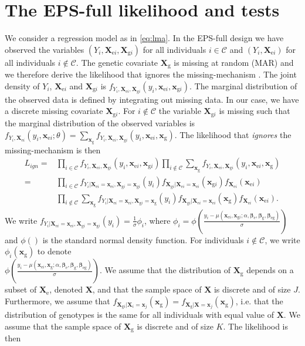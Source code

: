 \documentclass[10pt,a4paper]{article}
\def\bbetag{\bm{\beta}_{\text{g}}}
\def\bbetae{\bm{\beta}_{\text{e}}}
\def\bbetaeg{\bm{\beta}_{\text{eg}}}
\def\bx{\mathbf{x}}
\def\bX{\mathbf{X}}
\def\bxgi{\mathbf{x}_{\text{g}i}}
\def\bXgi{\mathbf{X}_{\text{g}i}}
\def\bxei{\mathbf{x}_{\text{e}i}}
\def\bXei{\mathbf{X}_{\text{e}i}}
\def\bxg{\mathbf{x}_{\text{g}}}
\def\bXg{\mathbf{X}_{\text{g}}}
\def\bXe{\mathbf{X}_{\text{e}}}
\begin{document}
\section{The EPS-full likelihood and tests}
We consider a regression model as in \eqref{eq:lma}. In the EPS-full design we have observed the variables $(Y_i,\bXei,\bXgi)$ for all individuals $i \in \mathcal{C}$ and $(Y_i,\bXei)$ for all individuals $i \not \in \mathcal{C}$. The genetic covariate $\bXg$ is missing at random (MAR) and we therefore derive the likelihood that ignores the missing-mechanism \citep{littlerubin2002}. The joint density of $Y_i$, $\bXei$ and $\bXgi$ is $f_{Y_i,\bXei, \bXgi}(y_i,\bxei,\bxgi)$. The marginal distribution of the observed data is defined by integrating out missing data. In our case, we have a discrete missing covariate $\bXgi$. For $i \not \in \mathcal{C}$ the variable $\bXgi$ is missing such that the marginal distribution of the observed variables is $f_{Y_i,\bXei}(y_i,\bxei;\theta) = \sum_{\bxg} f_{Y_i,\bXei,\bXgi}(y_i,\bxei,\bxg)$. The likelihood that \textit{ignores} the missing-mechanism is then
\begin{align*}
L_{ign} = & \prod_{i \in \mathcal{C}} f_{Y_i,\bXei,\bXgi}(y_i,\bxei,\bxgi) \prod_{i \not \in \mathcal{C}} \sum_{\bxg} f_{Y_i,\bXei,\bXgi}(y_i,\bxei,\bxg) \\
= & \prod_{i \in \mathcal{C}} f_{Y_i|\bXei = \bxei, \bXgi = \bxgi}(y_i) f_{\bXgi|\bXei = \bxei}(\bxgi)f_{\bXei}(\bxei)  \\ & \prod_{i \not \in \mathcal{C}}\sum_{\bxg} f_{Y_i|\bXei = \bxei, \bXgi = \bxg}(y_i) f_{\bXgi|\bXei = \bxei}(\bxg)f_{\bXei}(\bxei).
\end{align*}
We write $f_{Y_i|\bXei = \bxei, \bXgi = \bxgi}(y_i) = \frac{1}{\sigma}\phi_i$, where $\phi_i = \phi\left(\frac{y_i - \mu(\bxei, \bxgi; \alpha, \bbetae, \bbetag, \bbetaeg)}{\sigma}\right)$ and $\phi()$ is the standard normal density function. For individuals $i \not \in \mathcal{C}$, we write  $\phi_i(\bxg)$ to denote \\ $\phi\left(\frac{y_i - \mu(\bxei, \bxg; \alpha, \bbetae, \bbetag, \bbetaeg)}{\sigma}\right)$. We assume that the distribution of $\bXg$ depends on a subset of $\bXe$, denoted $\bX$, and that the sample space of $\bX$ is discrete and of size $J$. Furthermore, we assume that $f_{\bXgi|\bX_i = \bx_j}(\bxg) = f_{\bXg|\bX = \bx_j}(\bxg)$, i.e. that the distribution of genotypes is the same for all individuals with equal value of $\bX$. We assume that the sample space of $\bXg$ is discrete and of size $K$. The likelihood is then
\end{document}
